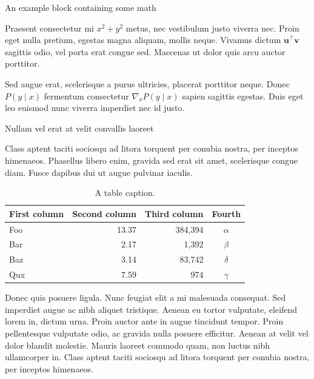 \documentclass[final]{beamer}
\newlength{\colwidth}
\begin{document}
\begin{frame}[t]
\begin{columns}[t]
\begin{column}{\colwidth}
\begin{exampleblock}{An example block containing some math}{}

				Praesent consectetur mi $x^2 + y^2$ metus, nec vestibulum justo viverra
				nec. Proin eget nulla pretium, egestas magna aliquam, mollis neque. Vivamus
				dictum $\mathbf{u}^\intercal\mathbf{v}$ sagittis odio, vel porta erat
				congue sed. Maecenas ut dolor quis arcu auctor porttitor.


				Sed augue erat, scelerisque a purus ultricies, placerat porttitor neque.
				Donec $P(y \mid x)$ fermentum consectetur $\nabla_x P(y \mid x)$ sapien
				sagittis egestas. Duis eget leo euismod nunc viverra imperdiet nec id
				justo.

			\end{exampleblock}

			\begin{block}{Nullam vel erat at velit convallis laoreet}

				Class aptent taciti sociosqu ad litora torquent per conubia nostra, per
				inceptos himenaeos. Phasellus libero enim, gravida sed erat sit amet,
				scelerisque congue diam. Fusce dapibus dui ut augue pulvinar iaculis.

				\begin{table}
					\centering
					\begin{tabular}{l r r c}
						\toprule
						\textbf{First column} & \textbf{Second column} & \textbf{Third column} & \textbf{Fourth} \\
						\midrule
						Foo                   & 13.37                  & 384,394               & $\alpha$        \\
						Bar                   & 2.17                   & 1,392                 & $\beta$         \\
						Baz                   & 3.14                   & 83,742                & $\delta$        \\
						Qux                   & 7.59                   & 974                   & $\gamma$        \\
						\bottomrule
					\end{tabular}
					\caption{A table caption.}
				\end{table}

				Donec quis posuere ligula. Nunc feugiat elit a mi malesuada consequat. Sed
				imperdiet augue ac nibh aliquet tristique. Aenean eu tortor vulputate,
				eleifend lorem in, dictum urna. Proin auctor ante in augue tincidunt
				tempor. Proin pellentesque vulputate odio, ac gravida nulla posuere
				efficitur. Aenean at velit vel dolor blandit molestie. Mauris laoreet
				commodo quam, non luctus nibh ullamcorper in. Class aptent taciti sociosqu
				ad litora torquent per conubia nostra, per inceptos himenaeos.


\end{block}
\end{column}
\end{columns}
\end{frame}
\end{document}
